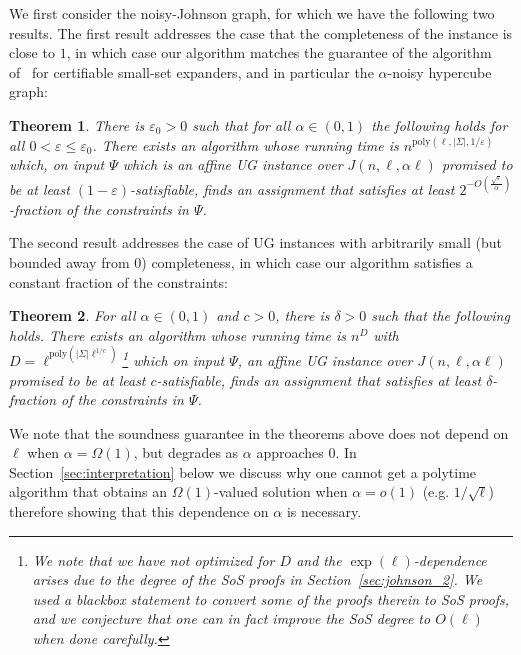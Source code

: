 \documentclass[11pt]{article}
\def \poly {\mathrm{poly}}
\def \eps {{\varepsilon}}
\newtheorem{theorem}{Theorem}[section]
\theoremstyle{definition}
\begin{document}
We first consider the noisy-Johnson graph, 
for which we have the following two results.
The first result addresses the case that 
the completeness of the instance is close to 
$1$, in which case our algorithm matches the 
guarantee of the algorithm of~\cite{BBKSS} 
for certifiable small-set expanders, and in particular the $\alpha$-noisy hypercube graph:
\begin{theorem}\label{thm:main_johnson_close_to_1}
There is $\eps_0>0$
such that for all $\alpha\in (0,1)$ 
the following holds for all $0<\eps\leq \eps_0$.
There exists an algorithm whose running time is $n^{\poly(\ell,|\Sigma|,1/\eps)}$ which, on input
$\Psi$ which is an affine UG instance over $J(n,\ell,\alpha\ell)$ promised to be at least $(1-\eps)$-satisfiable, finds an assignment that satisfies 
at least $2^{-O\left(\frac{\sqrt{\eps}}{\alpha}\right)}$-fraction of the constraints in $\Psi$.
\end{theorem}


The second result addresses the case of UG instances with arbitrarily small (but bounded away from $0$) completeness, in which case our algorithm satisfies a constant fraction of the constraints:

\begin{theorem}\label{thm:main_johnson}
For all $\alpha\in (0,1)$ and $c>0$, there is $\delta>0$ such that the following holds. 
There exists an algorithm whose running time is $n^{D}$ with $D = \ell^{\poly(|\Sigma|\ell^{1/c})}$\footnote{We note that we have not optimized for $D$ and the $\exp(\ell)$-dependence arises due to the degree of the SoS proofs in Section~\ref{sec:johnson_2}. We used a blackbox statement to convert some of the proofs therein to SoS proofs, and we conjecture that one can in fact improve the SoS degree to $O(\ell)$ when done carefully.} which on input
$\Psi$, an affine UG instance over $J(n,\ell,\alpha \ell)$ promised to be at least $c$-satisfiable, finds an assignment that satisfies 
at least $\delta$-fraction of the constraints in $\Psi$.
\end{theorem}


We note that the soundness guarantee in the theorems above does not depend on $\ell$ when $\alpha = \Omega(1)$, but degrades as $\alpha$ approaches $0$. In Section~\ref{sec:interpretation} below we discuss why one cannot get a polytime algorithm that obtains an $\Omega(1)$-valued solution when $\alpha = o(1)$ (e.g. $1/\sqrt{\ell}$) therefore showing that this dependence on $\alpha$ is necessary.
\end{document}

